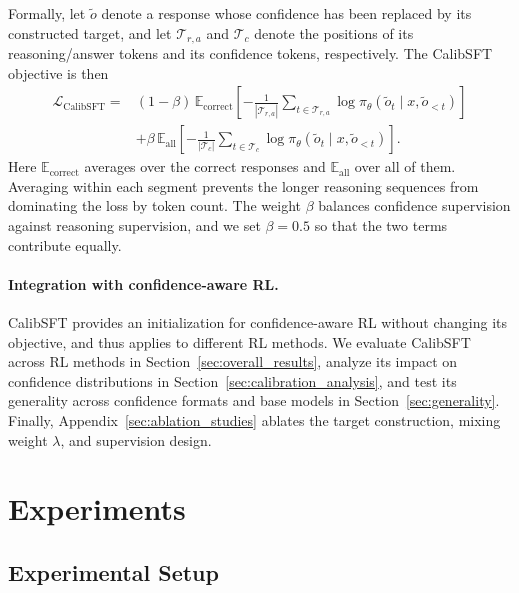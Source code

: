 \documentclass{article} %
\begin{document}
Formally, let $\widetilde o$ denote a response whose confidence has been
replaced by its constructed target, and let $\mathcal T_{r,a}$
and $\mathcal T_c$ denote the positions of its reasoning/answer tokens
and its confidence tokens, respectively.
The CalibSFT objective is then
\begin{equation}
\begin{split}
    \mathcal L_{\mathrm{CalibSFT}}={}&(1-\beta)\,\mathbb E_{\mathrm{correct}}
    \left[-\frac{1}{|\mathcal T_{r,a}|}\sum_{t\in\mathcal T_{r,a}}
    \log\pi_\theta(\widetilde o_t\mid x,\widetilde o_{<t})\right]\\
    &+\beta\,\mathbb E_{\mathrm{all}}
    \left[-\frac{1}{|\mathcal T_c|}\sum_{t\in\mathcal T_c}
    \log\pi_\theta(\widetilde o_t\mid x,\widetilde o_{<t})\right].
\end{split}
\end{equation}
Here $\mathbb E_{\mathrm{correct}}$ averages over the correct responses
and $\mathbb E_{\mathrm{all}}$ over all of them.
Averaging within each segment prevents the longer reasoning sequences
from dominating the loss by token count. 
The weight $\beta$ balances
confidence supervision against reasoning supervision, and we set
$\beta=0.5$ so that the two terms contribute equally.

\paragraph{Integration with confidence-aware RL.}
CalibSFT provides an initialization for confidence-aware RL
without changing its objective, and thus applies to different RL methods.
We evaluate CalibSFT across RL methods in Section~\ref{sec:overall_results}, 
analyze its impact on confidence distributions in Section~\ref{sec:calibration_analysis}, 
and test its generality across confidence formats and base models in Section~\ref{sec:generality}. 
Finally, Appendix~\ref{sec:ablation_studies} ablates the target construction, mixing weight $\lambda$, and supervision design. 

\section{Experiments}

\subsection{Experimental Setup}

\end{document}
